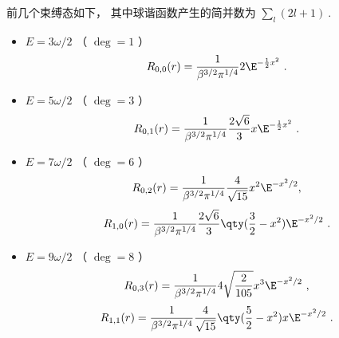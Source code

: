 前几个束缚态如下， 其中球谐函数产生的简并数为 $\sum_l (2l + 1)~.$
\begin{itemize}
\item $E = 3 \omega /2$ （ $\deg  = 1$ ）
\begin{equation}
R_{0,0}(r) = \frac{1}{\beta^{3/2} \pi^{1/4}} 2\E^{-\frac12 x^2}~.
\end{equation}

\item $E = 5 \omega /2$ （ $\deg  = 3$ ）
\begin{equation}
R_{0,1}(r) = \frac{1}{\beta^{3/2} \pi^{1/4}} \frac{2\sqrt 6}{3} x \E^{-\frac12 x^2}~.
\end{equation}

\item $E = 7 \omega /2$ （ $\deg  = 6$ ）
\begin{equation}
R_{0,2}(r) = \frac{1}{\beta^{3/2} \pi^{1/4}} \frac{4}{\sqrt{15}} x^2 \E^{- x^2/2},
\end{equation}
\begin{equation}
R_{1,0}(r) = \frac{1}{\beta^{3/2} \pi^{1/4}} \frac{2\sqrt 6}{3} \qty(\frac32 - x^2) \E^{-x^2/2}~.
\end{equation}

\item $E = 9 \omega /2$ （ $\deg  = 8$ ）
\begin{equation}
R_{0,3}(r) = \frac{1}{\beta^{3/2} \pi^{1/4}} 4\sqrt{\frac{2}{105}} x^3 \E^{-x^2/2}~,
\end{equation}
\begin{equation}
R_{1,1}(r) = \frac{1}{\beta^{3/2} \pi^{1/4}} \frac{4}{\sqrt{15}} \qty(\frac52 - x^2) x \E^{-x^2/2}~.
\end{equation}
\end{itemize}
